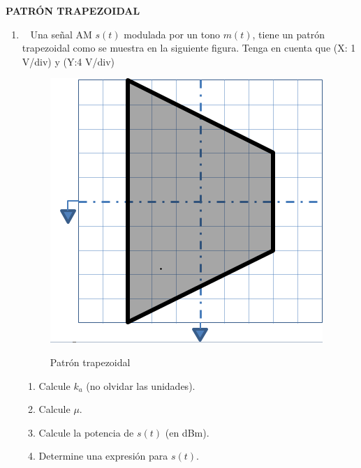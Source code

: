 
\pagebreak
\begin{center}
	\textbf{PATRÓN TRAPEZOIDAL}
	\\

\end{center}

\begin{enumerate}
	\item~ Una señal AM $s(t)$ modulada por un tono $m(t)$, tiene un patrón trapezoidal como se muestra en la siguiente figura. Tenga en cuenta que (X: 1 V/div) y (Y:4 V/div)

	\begin{figure}[h!]
		\captionsetup{justification = raggedright, singlelinecheck = false}
		\caption{Patrón trapezoidal} 
		\centering
		\includegraphics[scale=1]{Imagenes/trap1.png}
		\label{fig:trap1}
	\end{figure}

	\begin{enumerate}
		\item Calcule $k_a$ (no olvidar las unidades).
		\item Calcule $\mu$.
		
		\item Calcule la potencia de $s(t)$ (en dBm).
		
		
		\item Determine una expresión para $s(t)$.
		

\end{enumerate}
\end{enumerate}
